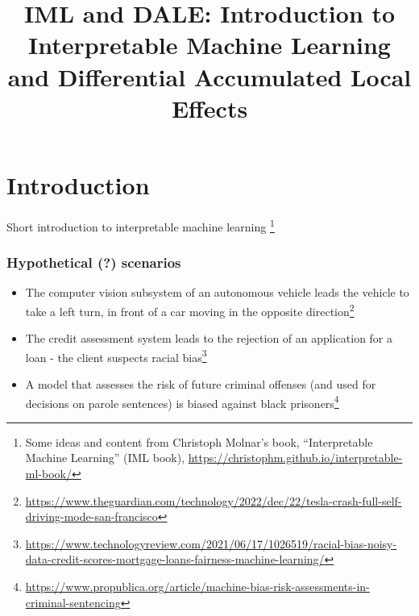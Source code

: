 



\title{\Large{IML and DALE: Introduction to Interpretable Machine
    Learning and Differential Accumulated Local Effects}}




\frame{\titlepage}


\section{Introduction}

\begin{frame}[plain,c]
  \Large Short introduction to interpretable machine learning \footnote{Some
  ideas and content from Christoph Molnar's book, ``Interpretable Machine Learning'' (IML book),
  \url{https://christophm.github.io/interpretable-ml-book/}}
\end{frame}

\begin{frame}
  \frametitle{Hypothetical (?) scenarios}

  \begin{itemize}
  \item<1-> The computer vision subsystem of an autonomous vehicle leads the
    vehicle to take a left turn, in front of a car moving in the opposite direction\footnote{\url{https://www.theguardian.com/technology/2022/dec/22/tesla-crash-full-self-driving-mode-san-francisco}}
  \item<2-> The credit assessment system leads to the rejection of an
    application for a loan - the client suspects racial bias\footnote{\url{https://www.technologyreview.com/2021/06/17/1026519/racial-bias-noisy-data-credit-scores-mortgage-loans-fairness-machine-learning/}}
  \item<3-> A model that assesses the risk of future criminal offenses (and
    used for decisions on parole sentences) is biased against black
    prisoners\footnote{\url{https://www.propublica.org/article/machine-bias-risk-assessments-in-criminal-sentencing}}
  \end{itemize}

\end{frame}

